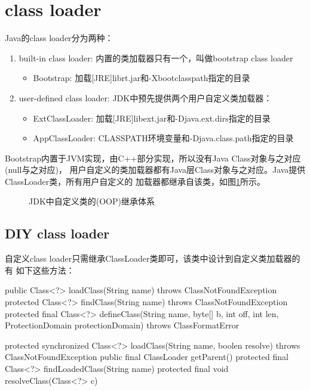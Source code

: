 ﻿\section[class loader]{class loader}
Java的class loader分为两种：
\begin{enumerate}
  \item built-in class loader: 内置的类加载器只有一个，叫做bootstrap class loader
    \begin{itemize}
      \item Bootstrap: 加载[JRE]\bs lib\bs rt.jar和-Xbootclasspath指定的目录
    \end{itemize}
  \item user-defined class loader: JDK中预先提供两个用户自定义类加载器：
    \begin{itemize}
      \item ExtClassLoader: 加载[JRE]\bs lib\bs ext\*.jar和-Djava.ext.dirs指定的目录
      \item AppClassLoader: CLASSPATH环境变量和-Djava.class.path指定的目录
    \end{itemize}
\end{enumerate}
Bootstrap内置于JVM实现，由C++部分实现，所以没有Java Class对象与之对应(null与之对应)，
用户自定义的类加载器都有Java层Class对象与之对应。Java提供ClassLoader类，所有用户自定义的
加载器都继承自该类，如图\ref{fig:classloadertree}所示。
\begin{figure}
  \centering
  \caption{JDK中自定义类的(OOP)继承体系}\label{fig:classloadertree}
\end{figure}

\subsection[DIY class loader]{DIY class loader}
自定义class loader只需继承ClassLoader类即可，该类中设计到自定义类加载器的有
如下这些方法：\\
\begin{javacode}
public Class<?> loadClass(String name)
  throws ClassNotFoundException { }
protected Class<?> findClass(String name)
  throws ClassNotFoundException { }
protected final Class<?> defineClass(String name, byte[] b, int off, int len,
  ProtectionDomain protectionDomain) throws ClassFormatError { }

protected synchronized Class<?> loadClass(String name, boolen resolve)
  throws ClassNotFoundException { }
public final ClassLoader getParent(){ }
protected final Class<?> findLoadedClass(String name) { }
protected final void resolveClass(Class<?> c) { }
\end{javacode}

